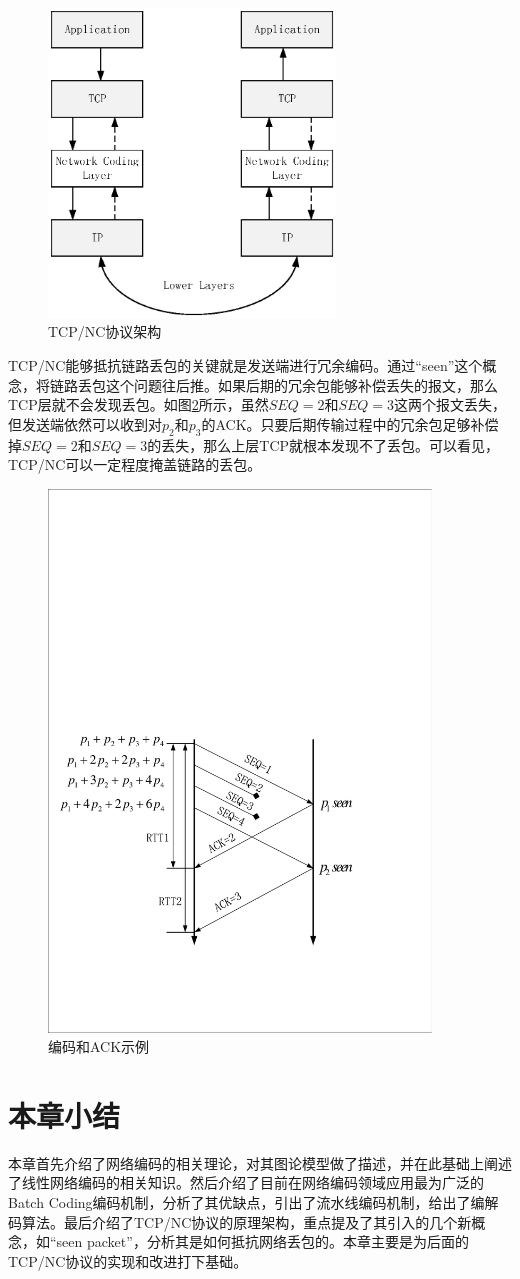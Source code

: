 \begin{figure}[htbp]
	\centering
	\includegraphics[width=3in]{figures/tcpnc.eps}
	\caption{TCP/NC协议架构}
	\label{TCPNC_EPS}
\end{figure}
\par
TCP/NC能够抵抗链路丢包的关键就是发送端进行冗余编码。通过“seen”这个概念，将链路丢包这个问题往后推。如果后期的冗余包能够补偿丢失的报文，那么TCP层就不会发现丢包。如图\ref{CODINGACK_EPS}所示，虽然$SEQ=2$和$SEQ=3$这两个报文丢失，但发送端依然可以收到对$p_{2}$和$p_{3}$的ACK。只要后期传输过程中的冗余包足够补偿掉$SEQ=2$和$SEQ=3$的丢失，那么上层TCP就根本发现不了丢包。可以看见，TCP/NC可以一定程度掩盖链路的丢包。
\begin{figure}[htbp]
	\centering
	\includegraphics[width=4in]{figures/codingack.pdf}
	\caption{编码和ACK示例}
	\label{CODINGACK_EPS}
\end{figure}
\section{本章小结}
本章首先介绍了网络编码的相关理论，对其图论模型做了描述，并在此基础上阐述了线性网络编码的相关知识。然后介绍了目前在网络编码领域应用最为广泛的Batch Coding编码机制，分析了其优缺点，引出了流水线编码机制，给出了编解码算法。最后介绍了TCP/NC协议的原理架构，重点提及了其引入的几个新概念，如“seen packet”，分析其是如何抵抗网络丢包的。本章主要是为后面的TCP/NC协议的实现和改进打下基础。 
